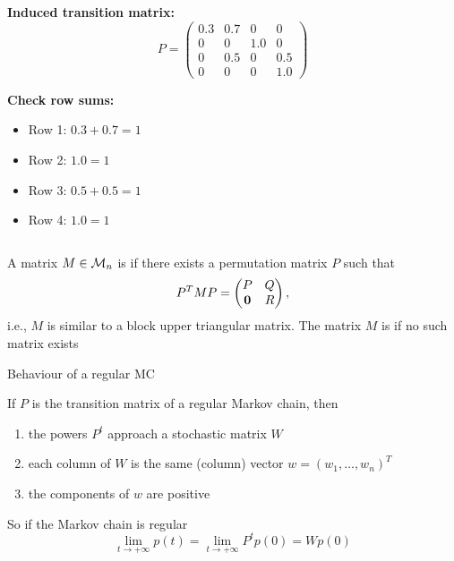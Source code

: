 \documentclass[aspectratio=169]{beamer}\usepackage[]{graphicx}\usepackage[]{xcolor}
\begin{document}
\begin{frame}
\begin{columns}[T]
        \begin{column}{.45\textwidth}
            \textbf{Induced transition matrix:}
            \vfill
            $$ P = \begin{pmatrix}
                0.3 & 0.7 & 0 & 0 \\
                0 & 0 & 1.0 & 0 \\
                0 & 0.5 & 0 & 0.5 \\
                0 & 0 & 0 & 1.0
            \end{pmatrix} $$
            
            \vfill
            \textbf{Check row sums:}
            \begin{itemize}
                \item Row 1: $0.3 + 0.7 = 1$
                \item Row 2: $1.0 = 1$
                \item Row 3: $0.5 + 0.5 = 1$
                \item Row 4: $1.0 = 1$
            \end{itemize}
        \end{column}
    \end{columns}
\end{frame}

\begin{frame}
\begin{definition}
A matrix $M\in\mathcal{M}_n$ is  if there exists a permutation matrix $P$ such that
\[
P^TMP=
\begin{pmatrix}
P & Q \\ \b0 & R
\end{pmatrix},
\]
i.e., $M$ is similar to a block upper triangular matrix. The matrix $M$ is  if no such matrix exists
\end{definition}
\end{frame}


\begin{frame}{Behaviour of a regular MC}
\begin{theorem}
If $P$ is the transition matrix of a regular Markov chain, then
\begin{enumerate}
\item the powers $P^t$ approach a stochastic matrix $W$
\item each column of $W$ is the same (column) vector $w=(w_1,\ldots,w_n)^T$
\item the components of $w$ are positive
\end{enumerate}
\end{theorem}
\vfill
So if the Markov chain is regular
\[
\lim_{t\rightarrow +\infty}p(t)=\lim_{t\rightarrow +\infty}P^tp(0)
=Wp(0)
\]
\end{frame}
\end{document}
